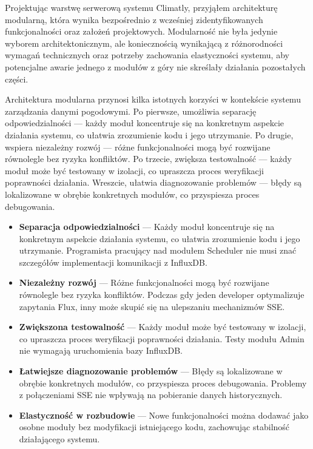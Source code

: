 \documentclass[a4paper,12pt,openany]{book}
\begin{document}
Projektując warstwę serwerową systemu Climatly, przyjąłem architekturę modularną, która wynika bezpośrednio z wcześniej zidentyfikowanych funkcjonalności oraz założeń projektowych. Modularność nie była jedynie wyborem architektonicznym, ale koniecznością wynikającą z różnorodności wymagań technicznych oraz potrzeby zachowania elastyczności systemu, aby potencjalne awarie jednego z modułów z góry nie skreślały działania pozostałych części.

Architektura modularna przynosi kilka istotnych korzyści w kontekście systemu zarządzania danymi pogodowymi. Po pierwsze, umożliwia separację odpowiedzialności — każdy moduł koncentruje się na konkretnym aspekcie działania systemu, co ułatwia zrozumienie kodu i jego utrzymanie. Po drugie, wspiera niezależny rozwój — różne funkcjonalności mogą być rozwijane równolegle bez ryzyka konfliktów. Po trzecie, zwiększa testowalność — każdy moduł może być testowany w izolacji, co upraszcza proces weryfikacji poprawności działania. Wreszcie, ułatwia diagnozowanie problemów — błędy są lokalizowane w obrębie konkretnych modułów, co przyspiesza proces debugowania.

\begin{itemize}[itemsep=3pt,topsep=5pt,parsep=0pt]
\item \textbf{Separacja odpowiedzialności} --- Każdy moduł koncentruje się na konkretnym aspekcie działania systemu, co ułatwia zrozumienie kodu i jego utrzymanie. Programista pracujący nad modułem Scheduler nie musi znać szczegółów implementacji komunikacji z InfluxDB.

\item \textbf{Niezależny rozwój} --- Różne funkcjonalności mogą być rozwijane równolegle bez ryzyka konfliktów. Podczas gdy jeden developer optymalizuje zapytania Flux, inny może skupić się na ulepszaniu mechanizmów SSE.

\item \textbf{Zwiększona testowalność} --- Każdy moduł może być testowany w izolacji, co upraszcza proces weryfikacji poprawności działania. Testy modułu Admin nie wymagają uruchomienia bazy InfluxDB.

\item \textbf{Łatwiejsze diagnozowanie problemów} --- Błędy są lokalizowane w obrębie konkretnych modułów, co przyspiesza proces debugowania. Problemy z połączeniami SSE nie wpływają na pobieranie danych historycznych.

\item \textbf{Elastyczność w rozbudowie} --- Nowe funkcjonalności można dodawać jako osobne moduły bez modyfikacji istniejącego kodu, zachowując stabilność działającego systemu.
\end{itemize}
\end{document}
